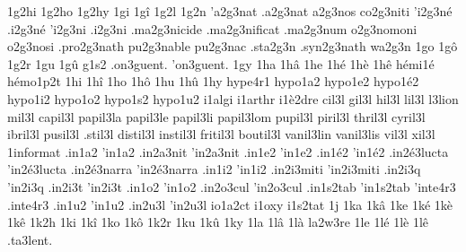 {1g2hi
1g2ho
1g2hy
1gi
1g\^i
1g2l
    1g2n
  'a2g3nat     %
  .a2g3nat     %
   a2g3nos     %
  co2g3niti    %
  'i2g3n\'e    %
  .i2g3n\'e    %
  'i2g3ni      %
  .i2g3ni      %
 .ma2g3nicide  %
 .ma2g3nificat %
 .ma2g3num     %
   o2g3nomoni  %
   o2g3nosi    %
.pro2g3nath    %
  pu2g3nable   %
  pu2g3nac     %
.sta2g3n
.syn2g3nath    %
  wa2g3n
1go
1g\^o
1g2r
1gu
1g\^u
g1s2
.on3guent.
'on3guent.
1gy
1ha
1h\^a
1he
1h\'e
1h\`e
1h\^e
                    h\'emi1\'e
                    h\'emo1p2t
1hi
1h\^i
1ho
1h\^o
1hu
1h\^u
1hy
                    hype4r1
                    hypo1a2
                    hypo1e2 %
                    hypo1\'e2
                    hypo1i2
                    hypo1o2
                    hypo1s2
                    hypo1u2
                    i1algi
                    i1arthr
                    i1\`e2dre
   cil3l
   gil3l
   hil3l
   lil3l
     l3lion
   mil3l
 capil3l
 papil3la
 papil3le
 papil3li
 papil3lom
 pupil3l
 piril3l
 thril3l
 cyril3l
 ibril3l
 pusil3l
 .stil3l
distil3l
instil3l
fritil3l
boutil3l
 vanil3lin
 vanil3lis
   vil3l
   xil3l
                    1informat %
                    .in1a2
                    'in1a2
                    .in2a3nit
                    'in2a3nit
                    .in1e2
                    'in1e2
                    .in1\'e2
                    'in1\'e2
                    .in2\'e3lucta
                    'in2\'e3lucta
                    .in2\'e3narra
                    'in2\'e3narra
                    .in1i2
                    'in1i2
                    .in2i3miti
                    'in2i3miti
                    .in2i3q
                    'in2i3q
                    .in2i3t
                    'in2i3t
                    .in1o2
                    'in1o2
                    .in2o3cul
                    'in2o3cul
                    .in1s2tab
                    'in1s2tab
                    'inte4r3
                    .inte4r3
                    .in1u2
                    'in1u2
                    .in2u3l
                    'in2u3l
                    io1a2ct
                    i1oxy
                    i1s2tat
1j
1ka
1k\^a
1ke
1k\'e
1k\`e
1k\^e
1k2h
1ki
1k\^i
1ko
1k\^o
1k2r
1ku
1k\^u
1ky
1la
1l\^a
1l\`a
                    la2w3re
1le
1l\'e
1l\`e
1l\^e
     .ta3lent.
}
